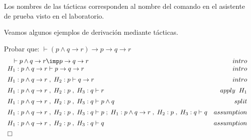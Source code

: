 \documentclass[11pt,letterpaper]{article}
\begin{document}
Los nombres de las tácticas corresponden al nombre del comando en el asistente 
de prueba {\coq} visto en el laboratorio.

\medskip

Veamos algunos ejemplos de derivación mediante tácticas.
\bi
\item Probar que: \hspace{0.5cm} 
$\vdash (p \wedge q \rightarrow r) \rightarrow p \rightarrow q \rightarrow r$  
\[
\begin{array}{lr}
 \quad \vdash p \wedge q \rightarrow r \imp  p  \rightarrow q \rightarrow r &   
 intro\\  \vspace*{5pt}
 H_1: p \wedge q \rightarrow r \vdash  p  \rightarrow q \rightarrow r &  
 intro\\ \vspace*{5pt}
 H_1: p \wedge q \rightarrow r \; , \; H_2: p  \vdash q \rightarrow r & 
 intro \\ \vspace*{5pt}
 H_1: p \wedge q \rightarrow r \; , \; H_2: p \; , \; H_3: q \vdash  r &
 apply \;\; H_1\\ \vspace*{5pt}
 H_1: p \wedge q \rightarrow r \; , \; H_2: p \; , \; H_3: q \vdash p \wedge q &
 split \\ \vspace*{5pt}
 H_1: p \wedge q \rightarrow r \; , \; H_2: p \; , \; H_3: q \vdash p \; ; \; 
 H_1: p \wedge q \rightarrow r \; , \; H_2: p \; , \; H_3: q \vdash q & 
 assumption \\ \vspace*{5pt}
 H_1: p \wedge q \rightarrow r \; , \; H_2: p \; , \; H_3: q \vdash q & 
 assumption \\ \vspace*{5pt}
 \square & 
\end{array}
\]
\end{document}
